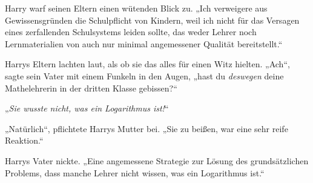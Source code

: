 Harry warf seinen Eltern einen wütenden Blick zu.
„Ich verweigere aus Gewissensgründen die Schulpflicht von Kindern, weil ich nicht für das Versagen eines zerfallenden Schulsystems leiden sollte, das weder Lehrer noch Lernmaterialien von auch nur minimal angemessener Qualität bereitstellt.“

Harrys Eltern lachten laut, als ob sie das alles für einen Witz hielten.
„Ach“, sagte sein Vater mit einem Funkeln in den Augen, „hast du \emph{deswegen} deine Mathelehrerin in der dritten Klasse gebissen?“

„\emph{Sie wusste nicht, was ein Logarithmus ist!}“%

„Natürlich“, pflichtete Harrys Mutter bei.
„Sie zu beißen, war eine sehr reife Reaktion.“

Harrys Vater nickte.
„Eine angemessene Strategie zur Lösung des grundsätzlichen Problems, dass manche Lehrer nicht wissen, was ein Logarithmus ist.“

